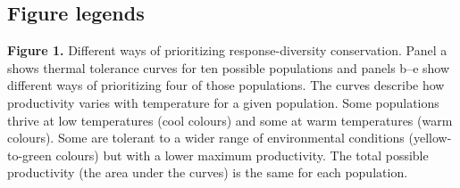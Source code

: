 \documentclass[11pt]{article}
\begin{document}

\linenumbers
\modulolinenumbers[2]
\begin{spacing}{1.6}
\setlength{\parindent}{0cm}



%


\clearpage

\section{Figure legends}



\textbf{Figure 1.} Different ways of prioritizing response-diversity conservation. Panel a shows thermal tolerance curves for ten possible populations and panels b--e show different ways of prioritizing four of those populations. The curves describe how productivity varies with temperature for a given population. Some populations thrive at low temperatures (cool colours) and some at warm temperatures (warm colours). Some are tolerant to a wider range of environmental conditions (yellow-to-green colours) but with a lower maximum productivity. The total possible productivity (the area under the curves) is the same for each population.




\end{spacing}
\end{document}

